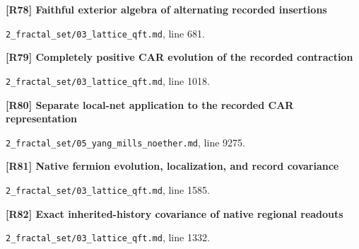 \documentclass[11pt,a4paper]{article}
\begin{document}
\par\medskip\noindent\begin{minipage}{\linewidth}\textbf{[R78] Faithful exterior algebra of alternating recorded insertions}\label{src:thm-lqft-oriented-word-algebra}\par
{\small\texttt{}\par
\nolinkurl{2_fractal_set/03_lattice_qft.md}, line 681.\par}
\end{minipage}\par

\par\medskip\noindent\begin{minipage}{\linewidth}\textbf{[R79] Completely positive CAR evolution of the recorded contraction}\label{src:thm-lqft-record-car-channel}\par
{\small\texttt{}\par
\nolinkurl{2_fractal_set/03_lattice_qft.md}, line 1018.\par}
\end{minipage}\par

\par\medskip\noindent\begin{minipage}{\linewidth}\textbf{[R80] Separate local-net application to the recorded CAR representation}\label{src:thm-ym-hk-record-instantiation}\par
{\small\texttt{}\par
\nolinkurl{2_fractal_set/05_yang_mills_noether.md}, line 9275.\par}
\end{minipage}\par

\par\medskip\noindent\begin{minipage}{\linewidth}\textbf{[R81] Native fermion evolution, localization, and record covariance}\label{src:thm-lqft-native-local-fermion-evolution}\par
{\small\texttt{}\par
\nolinkurl{2_fractal_set/03_lattice_qft.md}, line 1585.\par}
\end{minipage}\par

\par\medskip\noindent\begin{minipage}{\linewidth}\textbf{[R82] Exact inherited-history covariance of native regional readouts}\label{src:thm-lqft-inherited-history-covariance}\par
{\small\texttt{}\par
\nolinkurl{2_fractal_set/03_lattice_qft.md}, line 1332.\par}
\end{minipage}\par
\end{document}
